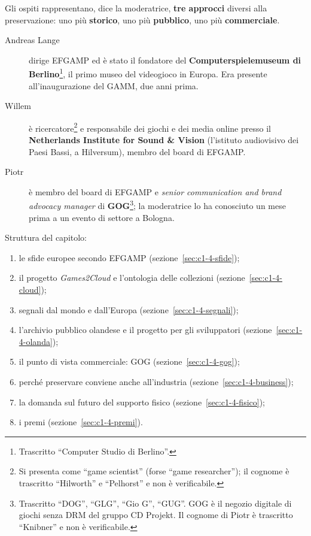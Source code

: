 Gli ospiti rappresentano, dice la moderatrice, \textbf{tre approcci} diversi alla
preservazione: uno più \textbf{storico}, uno più \textbf{pubblico}, uno più
\textbf{commerciale}.
\begin{description}
  \item[Andreas Lange] dirige EFGAMP ed è stato il fondatore del
        \textbf{Computerspielemuseum di Berlino}\footnote{Trascritto
        ``Computer Studio di Berlino''.}, il primo museo del videogioco in
        Europa. Era presente all'inaugurazione del GAMM, due anni prima.
  \item[Willem] è ricercatore\footnote{Si presenta come ``game scientist''
        (forse ``game researcher''); il cognome è trascritto ``Hilworth'' e
        ``Pelhorst'' e non è verificabile.} e responsabile dei giochi e dei
        media online presso il \textbf{Netherlands Institute for Sound \&
        Vision} (l'istituto audiovisivo dei Paesi Bassi, a Hilversum), membro del
        board di EFGAMP.
  \item[Piotr] è membro del board di EFGAMP e \emph{senior communication and
        brand advocacy manager} di \textbf{GOG}\footnote{Trascritto ``DOG'',
        ``GLG'', ``Gio G'', ``GUG''. GOG è il negozio digitale di giochi senza DRM
        del gruppo CD Projekt. Il cognome di Piotr è trascritto ``Knibner'' e
        non è verificabile.}; la moderatrice lo ha conosciuto un mese prima a un
        evento di settore a Bologna.
\end{description}

Struttura del capitolo:
\begin{enumerate}
  \item le sfide europee secondo EFGAMP (sezione~\ref{sec:c1-4-sfide});
  \item il progetto \emph{Games2Cloud} e l'ontologia delle collezioni
        (sezione~\ref{sec:c1-4-cloud});
  \item segnali dal mondo e dall'Europa (sezione~\ref{sec:c1-4-segnali});
  \item l'archivio pubblico olandese e il progetto per gli sviluppatori
        (sezione~\ref{sec:c1-4-olanda});
  \item il punto di vista commerciale: GOG (sezione~\ref{sec:c1-4-gog});
  \item perché preservare conviene anche all'industria
        (sezione~\ref{sec:c1-4-business});
  \item la domanda sul futuro del supporto fisico
        (sezione~\ref{sec:c1-4-fisico});
  \item i premi (sezione~\ref{sec:c1-4-premi}).
\end{enumerate}


